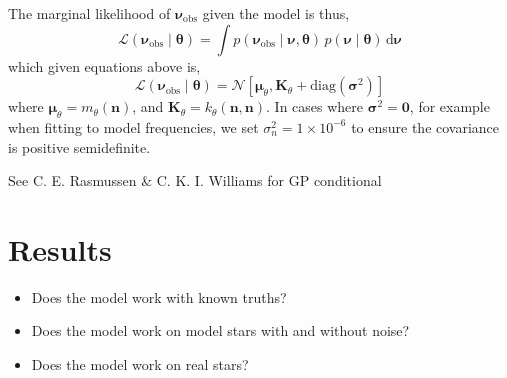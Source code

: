 \documentclass[linenumbers,modern,astrosymb,times]{aastex631}
\newcommand{\npred}{n_{\star}}
\newcommand{\dd}{\mathrm{d}}
\begin{document}
The marginal likelihood of \(\bm\nu_\mathrm{obs}\) given the model is thus,
%
\begin{equation}
    \mathcal{L}(\bm\nu_\mathrm{obs} \mid \bm\theta)
    = \int p(\bm\nu_\mathrm{obs} \mid \bm \nu, \bm\theta)
    \, p(\bm \nu \mid \bm\theta) \, \dd \bm \nu
\end{equation}
%
which given equations above is,
%
\begin{equation}
    \mathcal{L}(\bm\nu_\mathrm{obs} \mid \bm\theta) = \mathcal{N}\left[
        \bm\mu_\theta, \bm K_\theta
        + \mathrm{diag}(\bm\sigma^2)
        \right]
\end{equation}
%
where \(\bm\mu_\theta = m_\theta(\bm n)\), and
\(\bm K_\theta = k_\theta(\bm n, \bm n)\). In cases where
\(\bm\sigma^2 = \bm 0\), for example when fitting to model frequencies, we
set \(\sigma_n^2 = 1 \times 10^{-6}\) to ensure the covariance is positive
semidefinite.

See C. E. Rasmussen \& C. K. I. Williams for GP conditional
%


\section{Results}\label{sec:results}

\begin{itemize}
    \item Does the model work with known truths?
    \item Does the model work on model stars with and without noise?
    \item Does the model work on real stars?
\end{itemize}
\end{document}
